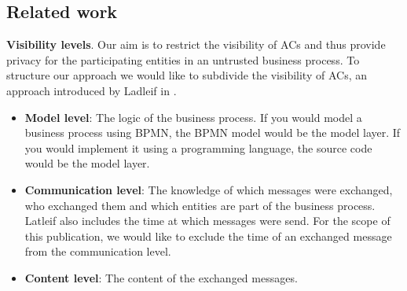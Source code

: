 \documentclass[runningheads]{llncs}
\newcommand{\comment}[1]{}
\begin{document}
\comment{
It displays the process of ordering, making and delivering pizza. In the process the \textit{Pizza Place} can decide weather to deliver straight away, using the \textit{Delivery Boy} as a middle man, or if it has order ingredients at the \textit{Wholesaler}. We chose a choreography diagram to display the process in order to emphasis the collaboration between the participants. Please keep in mind that in reality business processes might be much more complex and may involve many more participants. The example is kept simple on purpose and only serves as an illustration for our approach. 
}




\subsection{Related work} \label{sec:rel_work}


\textbf{Visibility levels}. Our aim is to restrict the visibility of ACs and thus provide privacy for the participating entities in an untrusted business process. To structure our approach we would like to subdivide the visibility of ACs, an approach introduced by Ladleif in \cite{ladleif}.

\begin{itemize}
    \item \textbf{Model level}: The logic of the business process. If you would model a business process using BPMN, the BPMN model would be the model layer. If you would implement it using a programming language, the source code would be the model layer.
    \item \textbf{Communication level}: The knowledge of which messages were exchanged, who exchanged them and which entities are part of the business process. Latleif also includes the time at which messages were send. For the scope of this publication, we would like to exclude the time of an exchanged message from the communication level.
    \item \textbf{Content level}: The content of the exchanged messages.
\end{itemize}
\end{document}
